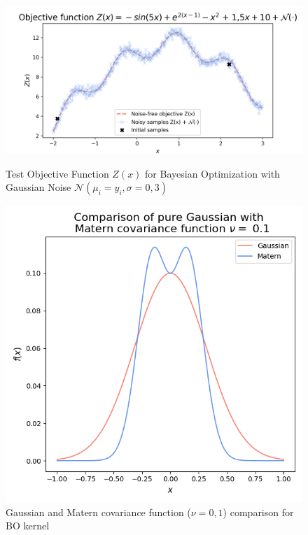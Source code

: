 \documentclass[12pt, a4paper]{article}
\begin{document}
\begin{figure}[htbp]
\begin{minipage}[t]{10cm}
\vspace{0pt}
\centering
\includegraphics[width=1\textwidth,trim={0 0 0 0},clip]{figures/bayesian_optimization_from_scratch_objective.png}
\caption[Test Objective Function for Bayesian Optimization]{Test Objective Function $Z(x)$ for Bayesian Optimization with Gaussian Noise $\mathcal{N}(\mu_i = y_i, \sigma = 0{,}3)$}
\label{fig: bo_objective}
\end{minipage}
\hfill
\begin{minipage}[t]{6cm}
\vspace{0pt}
\centering
\includegraphics[width=1\textwidth,trim={0 0 0 0},clip]{figures/covariance_function_matern_gaussian.png}
\caption[Covariance functions for BO kernel]{Gaussian and Matern covariance function ($\nu = 0{,}1$) comparison for BO kernel}
\label{fig: covariance_functions}
\end{minipage}
\end{figure}
\end{document}
